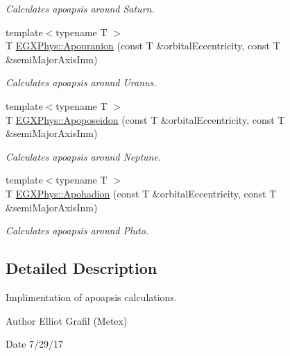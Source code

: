\begin{DoxyCompactItemize}
\begin{DoxyCompactList}\small\item\em Calculates apoapsis around Saturn. \end{DoxyCompactList}\item 
{\footnotesize template$<$typename T $>$ }\\T \mbox{\hyperlink{group___e_g_x_phys-_apoapsis_gae6f96c6d840188839132e0ef94ce0711}{E\+G\+X\+Phys\+::\+Apouranion}} (const T \&orbital\+Eccentricity, const T \&semi\+Major\+Axis\+Inm)
\begin{DoxyCompactList}\small\item\em Calculates apoapsis around Uranus. \end{DoxyCompactList}\item 
{\footnotesize template$<$typename T $>$ }\\T \mbox{\hyperlink{group___e_g_x_phys-_apoapsis_ga985afde0717360cffc6b5c17c9a42ac8}{E\+G\+X\+Phys\+::\+Apoposeidon}} (const T \&orbital\+Eccentricity, const T \&semi\+Major\+Axis\+Inm)
\begin{DoxyCompactList}\small\item\em Calculates apoapsis around Neptune. \end{DoxyCompactList}\item 
{\footnotesize template$<$typename T $>$ }\\T \mbox{\hyperlink{group___e_g_x_phys-_apoapsis_ga9e2578ab880b46f0736936608710f4ad}{E\+G\+X\+Phys\+::\+Apohadion}} (const T \&orbital\+Eccentricity, const T \&semi\+Major\+Axis\+Inm)
\begin{DoxyCompactList}\small\item\em Calculates apoapsis around Pluto. \end{DoxyCompactList}\end{DoxyCompactItemize}


\subsection{Detailed Description}
Implimentation of apoapsis calculations. 

\begin{DoxyAuthor}{Author}
Elliot Grafil (Metex) 
\end{DoxyAuthor}
\begin{DoxyDate}{Date}
7/29/17 
\end{DoxyDate}

